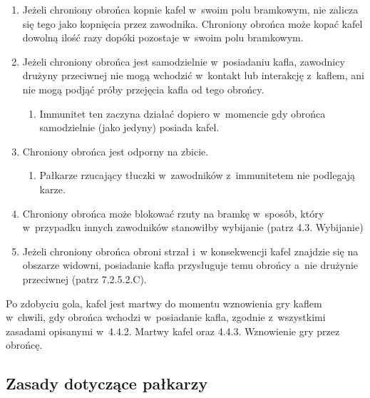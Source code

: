 \documentclass[12pt,a4paper]{article}
\renewcommand{\paragraph}[1]{
  \oldparagraph{#1}%
  \leftskip2.8cm
}
\begin{document}
\begin{enumerate}
	\item
	      Jeżeli chroniony obrońca kopnie kafel w~swoim polu bramkowym, nie
	      zalicza się tego jako kopnięcia przez zawodnika. Chroniony obrońca
	      może kopać kafel dowolną ilość razy dopóki pozostaje w~swoim polu
	      bramkowym.
	\item
	      Jeżeli chroniony obrońca jest samodzielnie w~posiadaniu kafla,
	      zawodnicy drużyny przeciwnej nie mogą wchodzić w~kontakt lub
	      interakcję z~kaflem, ani nie mogą podjąć próby przejęcia kafla od tego
	      obrońcy.

	      \begin{enumerate}
		      \item
		            Immunitet ten zaczyna działać dopiero w~momencie gdy obrońca
		            samodzielnie (jako jedyny) posiada kafel.
	      \end{enumerate}
	\item
	      Chroniony obrońca jest odporny na zbicie.

	      \begin{enumerate}
		      \item
		            Pałkarze rzucający tłuczki w~zawodników z~immunitetem nie podlegają
		            karze.
	      \end{enumerate}
	\item
	      Chroniony obrońca może blokować rzuty na bramkę w~sposób, który w~przypadku innych zawodników stanowiłby wybijanie (patrz 4.3.
	      Wybijanie)
	\item
	      Jeżeli chroniony obrońca obroni strzał i~w konsekwencji kafel znajdzie
	      się na obszarze widowni, posiadanie kafla przysługuje temu obrońcy a~nie drużynie przeciwnej (patrz 7.2.5.2.C).
\end{enumerate}

\paragraph{Wznowienie gry przez obrońcę}
Po zdobyciu gola, kafel
jest martwy do momentu wznowienia gry kaflem w~chwili, gdy obrońca
wchodzi w~posiadanie kafla, zgodnie z~wszystkimi zasadami opisanymi w~4.4.2. Martwy kafel oraz 4.4.3. Wznowienie gry przez obrońcę.

\subsection{Zasady dotyczące pałkarzy}
\end{document}
